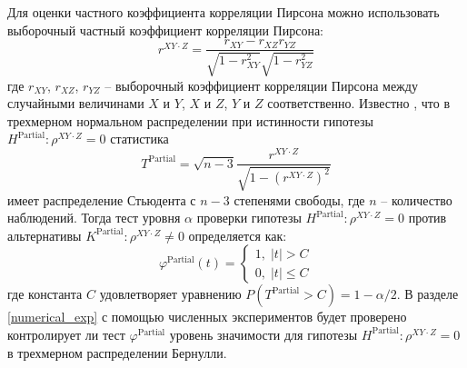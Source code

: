 Для оценки частного коэффициента корреляции Пирсона 
можно использовать
выборочный частный коэффициент корреляции Пирсона:
$$r^{XY\cdot Z}=\dfrac{r_{XY}-r_{XZ}r_{YZ}}{\sqrt{1-r_{XY}^2}\sqrt{1-r_{YZ}^2}}$$
где $r_{XY}$, $r_{XZ}$, $r_{YZ}$ -- выборочный коэффициент корреляции Пирсона
между случайными величинами $X$ и $Y$, $X$ и $Z$, $Y$ и $Z$
соответственно.  
Известно \cite{Anderson2003}, что 
в трехмерном нормальном распределении
при истинности гипотезы $H^{\text{Partial}}: \rho^{XY \cdot Z}=0$ статистика
$$
T^{\text{Partial}}=\sqrt{n-3} \dfrac{r^{XY \cdot Z}}{\sqrt{1-(r^{XY \cdot Z})^2}}
$$
имеет распределение Стьюдента с $n-3$ степенями свободы, 
где $n$ -- количество наблюдений.
Тогда тест уровня $\alpha$ проверки гипотезы $H^{\text{Partial}}:\rho^{XY\cdot Z}=0$
против альтернативы $K^{\text{Partial}}:\rho^{XY\cdot Z}\neq 0$
определяется как:
$$
\varphi^{\text{Partial}}(t) = \begin{cases}
    1, \; |t|>C \\ 
    0, \; |t|\leq C
\end{cases}
$$
где константа $C$ удовлетворяет уравнению
$P(T^{\text{Partial}}>C)=1-\alpha/2$.
В разделе \ref{numerical_exp} с помощью численных экспериментов 
будет проверено контролирует ли тест $\varphi^{\text{Partial}}$
уровень значимости для гипотезы $H^{\text{Partial}}:\rho^{XY\cdot Z}=0$ в трехмерном распределении Бернулли.
